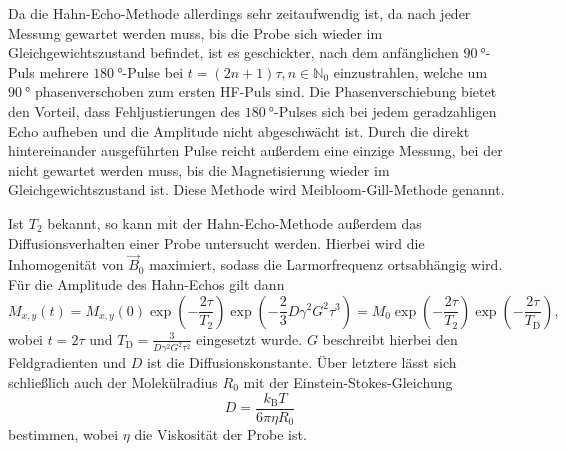 Da die Hahn-Echo-Methode allerdings sehr zeitaufwendig ist, da nach jeder Messung gewartet werden muss, bis die Probe sich wieder im Gleichgewichtszustand befindet, ist es geschickter, nach dem anfänglichen $\SI{90}{\degree}$-Puls mehrere $\SI{180}{\degree}$-Pulse bei $t = (2n+1)\tau, n \in \mathbb{N}_0$ einzustrahlen, welche um $\SI{90}{\degree}$ phasenverschoben zum ersten HF-Puls sind. Die Phasenverschiebung bietet den Vorteil, dass Fehljustierungen des $\SI{180}{\degree}$-Pulses sich bei jedem geradzahligen Echo aufheben und die Amplitude nicht abgeschwächt ist. Durch die direkt hintereinander ausgeführten Pulse reicht außerdem eine einzige Messung, bei der nicht gewartet werden muss, bis die Magnetisierung wieder im Gleichgewichtszustand ist. Diese Methode wird Meibloom-Gill-Methode genannt.

Ist $T_2$ bekannt, so kann mit der Hahn-Echo-Methode außerdem das Diffusionsverhalten einer Probe untersucht werden. Hierbei wird die Inhomogenität von $\vec{B}_0$ maximiert, sodass die Larmorfrequenz ortsabhängig wird. Für die Amplitude des Hahn-Echos gilt dann
\begin{equation}
  M_{x,y} \left(t\right) = M_{x,y}\left(0\right) \exp \left(-\frac{2\tau}{T_2}\right) \exp \left(-\frac{2}{3} D \gamma^2 G^2 \tau^3\right) = M_0 \exp \left(-\frac{2\tau}{T_2}\right) \exp \left(-\frac{2\tau}{T_\mathrm{D}}\right),
  \label{eq:D}
\end{equation}
wobei $t = 2\tau$ und $T_\mathrm{D} = \frac{3}{D \gamma^2 G^2 \tau^2}$ eingesetzt wurde. $G$ beschreibt hierbei den Feldgradienten und $D$ ist die Diffusionskonstante. Über letztere lässt sich schließlich auch der Molekülradius $R_0$ mit der Einstein-Stokes-Gleichung
\begin{equation}
  D = \frac{k_\mathrm{B} T}{6\pi\eta R_0}
  \label{eq:R0}
\end{equation}
bestimmen, wobei $\eta$ die Viskosität der Probe ist.

